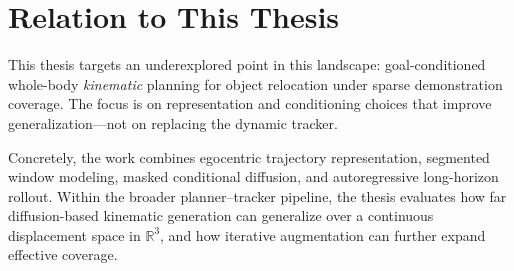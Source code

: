 \section{Relation to This Thesis}

This thesis targets an underexplored point in this landscape: goal-conditioned whole-body \emph{kinematic} planning for object relocation under sparse demonstration coverage. The focus is on representation and conditioning choices that improve generalization---not on replacing the dynamic tracker.

Concretely, the work combines egocentric trajectory representation, segmented window modeling, masked conditional diffusion, and autoregressive long-horizon rollout. Within the broader planner--tracker pipeline, the thesis evaluates how far diffusion-based kinematic generation can generalize over a continuous displacement space in $\mathbb{R}^{3}$, and how iterative augmentation can further expand effective coverage.
